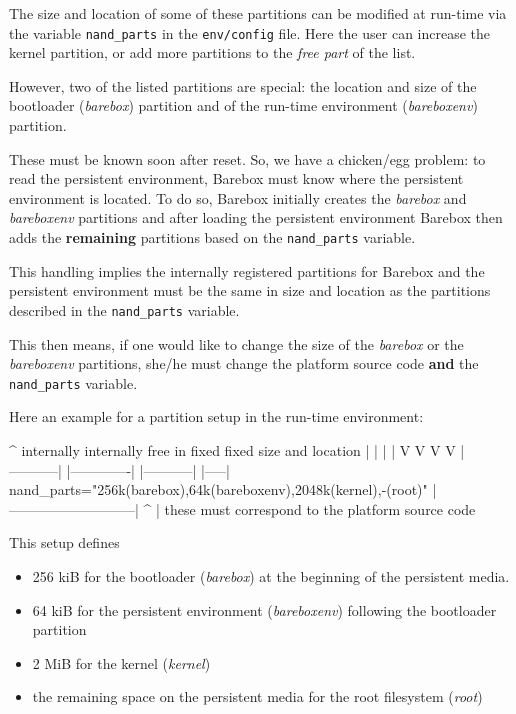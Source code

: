 The size and location of some of these partitions can be modified at run-time
via the variable \texttt{nand_parts} in the \texttt{env/config} file. Here the
user can increase the kernel partition, or add more partitions to the
\textit{free part} of the list.

However, two of the listed partitions are special: the location and size of
the bootloader (\textit{barebox}) partition and of the run-time environment
(\textit{bareboxenv}) partition.
%
%
%

These must be known soon after reset. So, we have a chicken/egg problem: to
read the persistent environment, Barebox must know where the persistent environment
is located. To do so, Barebox initially creates the \textit{barebox} and
\textit{bareboxenv} partitions and after loading the persistent environment
Barebox then adds the \textbf{remaining} partitions based on the
\texttt{nand_parts} variable.

This handling implies the internally registered partitions for Barebox and the
persistent environment must be the same in size and location as the partitions
described in the \texttt{nand_parts} variable.

This then means, if one would like to change the size of the \textit{barebox}
or the \textit{bareboxenv} partitions, she/he must change the platform source
code \textbf{and} the \texttt{nand_parts} variable.

Here an example for a partition setup in the run-time environment:

\begin{ptxshell}[escapechar=|]{^}
              internally    internally            free in
               fixed          fixed           size and location
                 |              |              |           |
                 V              V              V           V
            |-----------| |-------------| |-----------| |-----|
nand_parts="256k(barebox),64k(bareboxenv),2048k(kernel),-(root)"
            |---------------------------|
                        ^
                        |
              these must correspond to
              the platform source code
\end{ptxshell}

This setup defines

\begin{itemize}
 \item 256 kiB for the bootloader (\textit{barebox}) at the beginning of the
  persistent media.
 \item 64 kiB for the persistent environment (\textit{bareboxenv}) following
  the bootloader partition
 \item 2 MiB for the kernel (\textit{kernel})
 \item the remaining space on the persistent media for the root filesystem
  (\textit{root})
\end{itemize}

